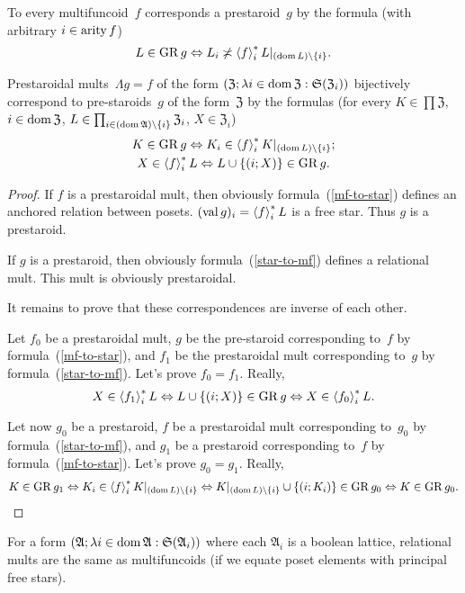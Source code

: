 \begin{defn}
To every multifuncoid~$f$ corresponds a prestaroid~$g$ by the
formula (with arbitrary $i\in\operatorname{arity} f$) 
\[
L\in\operatorname{GR} g\Leftrightarrow L_{i}\not\asymp\left\langle f\right\rangle ^{\ast}_{i}L|_{(\operatorname{dom} L)\setminus\{i\}}.
\]
\end{defn}
\begin{prop}
Prestaroidal mults~$\Lambda g=f$ of the form $(\mathfrak{Z};\lambda i\in\operatorname{dom}\mathfrak{Z}:\mathfrak{S}(\mathfrak{Z}_{i}))$
bijectively correspond to pre-staroids~$g$ of the form~$\mathfrak{Z}$
by the formulas (for every $K\in\prod\mathfrak{Z}$, $i\in\operatorname{dom}\mathfrak{Z}$,
$L\in\prod_{i\in(\operatorname{dom}\mathfrak{A})\setminus\{i\}}\mathfrak{Z}_{i}$,
$X\in\mathfrak{Z}_{i}$)
\begin{gather}
K\in\operatorname{GR} g\Leftrightarrow K_{i}\in\left\langle f\right\rangle ^{\ast}_{i}K|_{(\operatorname{dom} L)\setminus\{i\}};\label{mf-to-star}\\
X\in\left\langle f\right\rangle ^{\ast}_{i}L\Leftrightarrow L\cup\{(i;X)\}\in\operatorname{GR} g.\label{star-to-mf}
\end{gather}
\end{prop}
\begin{proof}
If $f$ is a prestaroidal mult, then obviously formula~(\ref{mf-to-star})
defines an anchored relation between posets. $(\operatorname{val} g)_{i}=\left\langle f\right\rangle ^{\ast}_{i}L$
is a free star. Thus $g$ is a prestaroid.

If $g$ is a prestaroid, then obviously formula~(\ref{star-to-mf})
defines a relational mult. This mult is obviously prestaroidal.

It remains to prove that these correspondences are inverse of each
other.

Let $f_{0}$ be a prestaroidal mult, $g$ be the pre-staroid corresponding
to~$f$ by formula~(\ref{mf-to-star}), and $f_{1}$ be the prestaroidal
mult corresponding to~$g$ by formula~(\ref{star-to-mf}). Let's
prove $f_{0}=f_{1}$. Really, 
\[
X\in\left\langle f_{1}\right\rangle ^{\ast}_{i}L\Leftrightarrow L\cup\{(i;X)\}\in\operatorname{GR} g\Leftrightarrow X\in\left\langle f_{0}\right\rangle ^{\ast}_{i}L.
\]


Let now $g_{0}$ be a prestaroid, $f$ be a prestaroidal mult corresponding
to~$g_{0}$ by formula~(\ref{star-to-mf}), and $g_{1}$ be a prestaroid
corresponding to~$f$ by formula~(\ref{mf-to-star}). Let's prove
$g_{0}=g_{1}$. Really, 
\[
K\in\operatorname{GR} g_{1}\Leftrightarrow K_{i}\in\left\langle f\right\rangle ^{\ast}_{i}K|_{(\operatorname{dom} L)\setminus\{i\}}\Leftrightarrow K|_{(\operatorname{dom} L)\setminus\{i\}}\cup\{(i;K_{i})\}\in\operatorname{GR} g_{0}\Leftrightarrow K\in\operatorname{GR} g_{0}.
\]
\end{proof}
\begin{prop}
For a form $(\mathfrak{A};\lambda i\in\operatorname{dom}\mathfrak{A}:\mathfrak{S}(\mathfrak{A}_{i}))$
where each $\mathfrak{A}_{i}$ is a boolean lattice, relational mults
are the same as multifuncoids (if we equate poset elements with principal
free stars).\end{prop}
